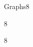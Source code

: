 \documentclass[a4paper]{article}
\begin{document}
\header

\begin{problem}{Graphs}{8}
\end{problem}

\begin{problem}{}{8}
\end{problem}

\begin{problem}{}{8}

\end{problem}
\end{document}
